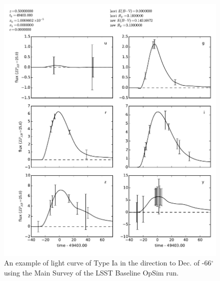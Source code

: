 \begin{figure}[tbh!]
\includegraphics[angle=0,width=0.99\hsize:,clip]{figs/supernova/s1_lc_coaddedDecminus66RA115.pdf}
\caption{An example of light curve of Type Ia in the direction to Dec. of -66$^{\circ}$ 
 using the Main Survey of the LSST Baseline OpSim run. 
}
\label{fig:SNIaLCminus66}
\end{figure}


